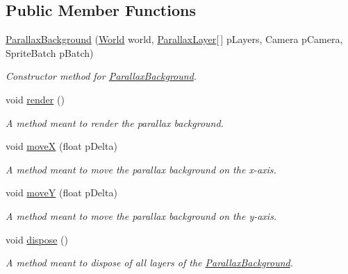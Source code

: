 \subsection*{Public Member Functions}
\begin{DoxyCompactItemize}
\item 
\hyperlink{classnl_1_1arjanfrans_1_1mario_1_1view_1_1ParallaxBackground_ad010a277850f31090a024be8da54e3bb}{Parallax\+Background} (\hyperlink{classnl_1_1arjanfrans_1_1mario_1_1model_1_1World}{World} world, \hyperlink{classnl_1_1arjanfrans_1_1mario_1_1view_1_1ParallaxLayer}{Parallax\+Layer}\mbox{[}$\,$\mbox{]} p\+Layers, Camera p\+Camera, Sprite\+Batch p\+Batch)
\begin{DoxyCompactList}\small\item\em Constructor method for \hyperlink{classnl_1_1arjanfrans_1_1mario_1_1view_1_1ParallaxBackground}{Parallax\+Background}. \end{DoxyCompactList}\item 
\mbox{\label{classnl_1_1arjanfrans_1_1mario_1_1view_1_1ParallaxBackground_ac24d0a672fd58eaf3db65d09971c5f8a}} 
void \hyperlink{classnl_1_1arjanfrans_1_1mario_1_1view_1_1ParallaxBackground_ac24d0a672fd58eaf3db65d09971c5f8a}{render} ()
\begin{DoxyCompactList}\small\item\em A method meant to render the parallax background. \end{DoxyCompactList}\item 
void \hyperlink{classnl_1_1arjanfrans_1_1mario_1_1view_1_1ParallaxBackground_af5959c6214b1e4fecd434a8022baf449}{moveX} (float p\+Delta)
\begin{DoxyCompactList}\small\item\em A method meant to move the parallax background on the x-\/axis. \end{DoxyCompactList}\item 
void \hyperlink{classnl_1_1arjanfrans_1_1mario_1_1view_1_1ParallaxBackground_a626301d2f854e2876a93f0df64e4b533}{moveY} (float p\+Delta)
\begin{DoxyCompactList}\small\item\em A method meant to move the parallax background on the y-\/axis. \end{DoxyCompactList}\item 
\mbox{\label{classnl_1_1arjanfrans_1_1mario_1_1view_1_1ParallaxBackground_a4fb35c31a1d177b1105dbad0395867aa}} 
void \hyperlink{classnl_1_1arjanfrans_1_1mario_1_1view_1_1ParallaxBackground_a4fb35c31a1d177b1105dbad0395867aa}{dispose} ()
\begin{DoxyCompactList}\small\item\em A method meant to dispose of all layers of the \hyperlink{classnl_1_1arjanfrans_1_1mario_1_1view_1_1ParallaxBackground}{Parallax\+Background}. \end{DoxyCompactList}\end{DoxyCompactItemize}
